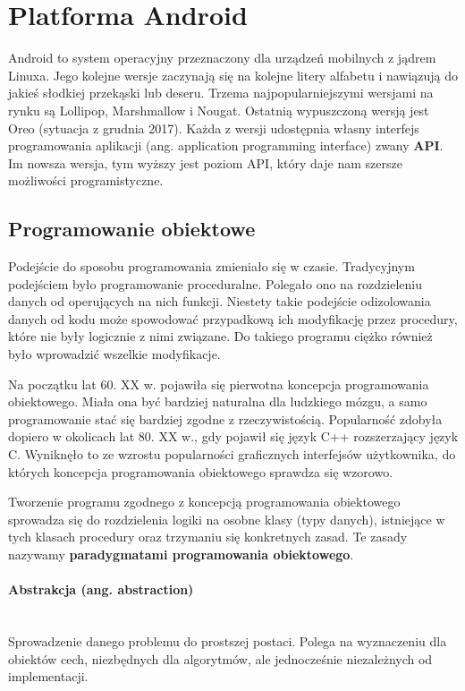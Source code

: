 \section{Platforma Android}
Android to system operacyjny przeznaczony dla urządzeń mobilnych z jądrem Linuxa. Jego kolejne wersje zaczynają się na kolejne litery alfabetu i nawiązują do jakieś słodkiej przekąski lub deseru. Trzema najpopularniejszymi wersjami na rynku są Lollipop, Marshmallow i Nougat. Ostatnią wypuszczoną wersją jest Oreo (sytuacja z grudnia 2017). Każda z wersji udostępnia własny interfejs programowania aplikacji (ang. application programming interface) zwany \textbf{API}. Im nowsza wersja, tym wyższy jest poziom API, który daje nam szersze możliwości programistyczne.
\subsection{Programowanie obiektowe}
Podejście do sposobu programowania zmieniało się w czasie. Tradycyjnym podejściem było programowanie proceduralne. Polegało ono na rozdzieleniu danych od operujących na nich funkcji. Niestety takie podejście odizolowania danych od kodu może spowodować przypadkową ich modyfikację przez procedury, które nie były logicznie z nimi związane. Do takiego programu ciężko również było wprowadzić wszelkie modyfikacje. \par
Na początku lat 60. XX w. pojawiła się pierwotna koncepcja programowania obiektowego. Miała ona być bardziej naturalna dla ludzkiego mózgu, a samo programowanie stać się bardziej zgodne z rzeczywistością. Popularność zdobyła dopiero w okolicach lat 80. XX w., gdy pojawił się język C++ rozszerzający język C. Wyniknęło to ze wzrostu popularności graficznych interfejsów użytkownika, do których koncepcja programowania obiektowego sprawdza się wzorowo.\par Tworzenie programu zgodnego z koncepcją programowania obiektowego sprowadza się do rozdzielenia logiki na osobne klasy (typy danych), istniejące w tych klasach procedury oraz trzymaniu się konkretnych zasad. Te zasady nazywamy \textbf{paradygmatami programowania obiektowego}.
\paragraph{Abstrakcja (ang. abstraction)}\mbox{}\\ Sprowadzenie danego problemu do prostszej postaci. Polega na wyznaczeniu dla obiektów cech, niezbędnych dla algorytmów, ale jednocześnie niezależnych od implementacji.
